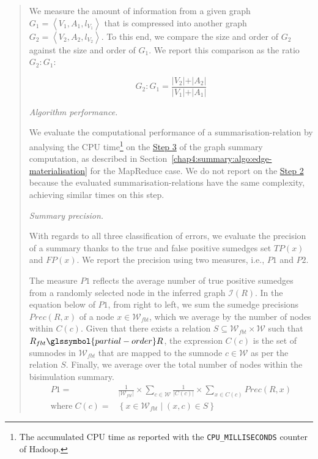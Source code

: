 \begin{quotation}
	We measure the amount of information from a given graph $G_1 = \left\langle V_1, A_1, l_{V_1} \right\rangle$ that is compressed into another graph $G_2 = \left\langle V_2, A_2, l_{V_2} \right\rangle$. To this end, we compare the size and order of $G_2$ against the size and order of $G_1$. We report this comparison as the ratio $G_2:G_1$:

	$$
	G_2:G_1 = \frac{\vert V_2 \vert + \vert A_2 \vert}{\vert V_1 \vert + \vert A_1 \vert}
	$$

	\item[\emph{Algorithm performance.}]

	We evaluate the computational performance of a \gls{summarisation-relation} by analysing the CPU time\footnote{The accumulated CPU time as reported with the \texttt{CPU\_MILLISECONDS} counter of Hadoop.} on the \hyperref[step-he]{Step 3} of the graph summary computation, as described in Section~\ref{chap4:summary:algo:edge-materialisation} for the MapReduce case. We do not report on the \hyperref[step-hn]{Step 2} because the evaluated \glspl{summarisation-relation} have the same complexity, achieving similar times on this step.

	\item[\emph{Summary precision.}]

	With regards to all three classification of errors, we evaluate the precision of a summary thanks to the true and false positive sumedges set $TP(x)$ and $FP(x)$.
	We report the precision using two measures, i.e., $P1$ and $P2$.

	The measure $P1$ reflects the average number of true positive sumedges from a randomly selected node in the inferred graph $\mathcal{I}(R)$. In the equation below of $P1$, from right to left, we sum the sumedge precisions $Prec(R, x)$ of a node $x\in \mathcal{W}_{fbt}$, which we average by the number of nodes within $C(c)$. Given that there exists a relation $S \subseteq \mathcal{W}_{fbt} \times \mathcal{W}$ such that $R_{fbt} \glssymbol{partial-order} R$, the expression $C(c)$ is the set of sumnodes in $\mathcal{W}_{fbt}$ that are mapped to the sumnode $c \in \mathcal{W}$ as per the relation $S$. Finally, we average over the total number of nodes within the bisimulation summary.
	$$
	\begin{aligned}
	P1 = & \frac{1}{\vert \mathcal{W}_{fbt} \vert} \times \sum_{c \in \mathcal{W}}{\frac{1}{\vert C(c) \vert} \times \sum_{x \in C(c)}{Prec(R, x)}} \\
	\text{where}\; C(c) = & \left\lbrace x \in \mathcal{W}_{fbt} \mid (x, c) \in S \right\rbrace
	\end{aligned}
	$$


\end{quotation}
